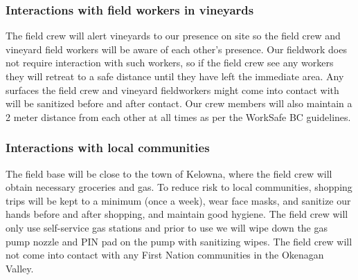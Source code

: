 \documentclass[11pt,letter]{article}
\begin{document}
\subsubsection{Interactions with field workers in vineyards}
The field crew will alert vineyards to our presence on site so the field crew and vineyard field workers will be aware of each other's presence. Our fieldwork does not require interaction with such workers, so if the field crew see any workers they will retreat to a safe distance until they have left the immediate area. Any surfaces the field crew and vineyard fieldworkers might come into contact with will be sanitized before and after contact. Our crew members will also maintain a 2 meter distance from each other at all times as per the WorkSafe BC guidelines.   

\subsubsection{Interactions with local communities}
The field base will be close to the town of Kelowna, where the field crew will obtain necessary groceries and gas. To reduce risk to local communities, shopping trips will be kept to a minimum (once a week), wear face masks, and sanitize our hands before and after shopping, and maintain good hygiene. The field crew will only use self-service gas stations and prior to use we will wipe down the gas pump nozzle and PIN pad on the pump with sanitizing wipes. The field crew will not come into contact with any First Nation communities in the Okenagan Valley. 
\end{document}
